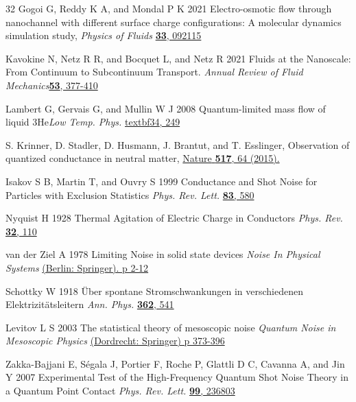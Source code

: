 \documentclass[%
 reprint,
 aps,
 prb,
 epsf,
]{revtex4-2}
\begin{document}
\begin{thebibliography}{32}
 Gogoi G, Reddy K A, and Mondal P K 2021 Electro-osmotic flow through nanochannel with different surface charge configurations: A molecular dynamics simulation study, \textit{Physics of Fluids} \href{https://doi.org/10.1063/5.0062031}{\textbf{33}, 092115}

 Kavokine N, Netz R R, and Bocquet L, and Netz R 2021 Fluids at the Nanoscale: From Continuum to Subcontinuum Transport. \textit{Annual Review of Fluid Mechanics}\href{https://doi.org/10.1146/annurev-fluid-071320-095958}{\textbf{53}, 377-410}  


 
 Lambert G, Gervais G, and Mullin W J 2008 Quantum-limited mass flow of liquid 3He\textit{Low Temp. Phys. } \href{https://doi.org/10.1063/1.2908872}{textbf{34}, 249}

S. Krinner, D. Stadler, D. Husmann, J. Brantut, and T. Esslinger, Observation of quantized conductance in neutral matter, \href {https://doi.org/10.1038/nature14049} {{Nature} \textbf{517}, 64 (2015).}

Isakov S B, Martin T, and Ouvry S 1999 Conductance and Shot Noise for Particles with Exclusion Statistics \textit{Phys. Rev. Lett. } \href {https://doi.org/10.1103/physrevlett.83.580} {\textbf{83}, 580}

 Nyquist H 1928 Thermal Agitation of Electric Charge in Conductors \textit{Phys. Rev. } \href {https://doi.org/10.1103/PhysRev.32.110}{\textbf{32}, 110}

 van der Ziel A 1978 Limiting Noise in solid state devices \textit{Noise In Physical Systems } \href {https://doi.org/10.1007/978-3-642-87640-0_1}{(Berlin: Springer). p 2-12}

 Schottky W 1918 Über spontane Stromschwankungen in verschiedenen Elektrizitätsleitern \textit{Ann. Phys. }\href{https://doi.org/10.1002/andp.19183622304}{\textbf{362}, 541}

 Levitov L S 2003 The statistical theory of mesoscopic noise \textit{Quantum Noise in Mesoscopic Physics} \href{https://doi.org/10.1007/978-94-010-0089-5_18}{(Dordrecht: Springer) p 373-396}

Zakka-Bajjani E, Ségala J, Portier F, Roche P, Glattli D C, Cavanna A, and Jin Y 2007 Experimental Test of the High-Frequency Quantum Shot Noise Theory in a Quantum Point Contact \textit{Phys. Rev. Lett.} \href {https://doi.org/10.1103/PhysRevLett.99.236803}{\textbf{99}, 236803}


\end{thebibliography}
\end{document}
